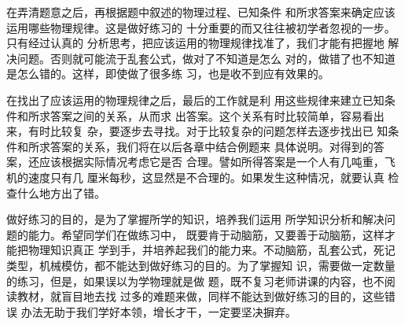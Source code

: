     在弄清题意之后，再根据题中叙述的物理过程、已知条件
和所求答案来确定应该运用哪些物理规律。这是做好练习的
十分重要的而又往往被初学者忽视的一步。只有经过认真的
分析思考，把应该运用的物理规律找准了，我们才能有把握地
解决问题。否则就可能流于乱套公式，做对了不知道是怎么
对的，做错了也不知道是怎么错的。这样，即使做了很多练
习，也是收不到应有效果的。

    在找出了应该运用的物理规律之后，最后的工作就是利
用这些规律来建立已知条件和所求答案之间的关系，从而求
出答案。这个关系有时比较简单，容易看出来，有时比较复
杂，要逐步去寻找。对于比较复杂的问题怎样去逐步找出已
知条件和所求答案的关系，我们将在以后各章中结合例题来
具体说明。对得到的答案，还应该根据实际情况考虑它是否
合理。譬如所得答案是一个人有几吨重，飞机的速度只有几
厘米每秒，这显然是不合理的。如果发生这种情况，就要认真
检查什么地方出了错。

    做好练习的目的，是为了掌握所学的知识，培养我们运用
所学知识分析和解决问题的能力。希望同学们在做练习中，
既要肯于动脑筋，又要善于动脑筋，这样才能把物理知识真正
学到手，并培养起我们的能力来。不动脑筋，乱套公式，死记
类型，机械模仿，都不能达到做好练习的目的。为了掌握知
识，需要做一定数量的练习，但是，如果误以为学物理就是做
题，既不复习老师讲课的内容，也不阅读教材，就盲目地去找
过多的难题来做，同样不能达到做好练习的目的，这些错误
办法无助于我们学好本领，增长才干，一定要坚决摒弃。
